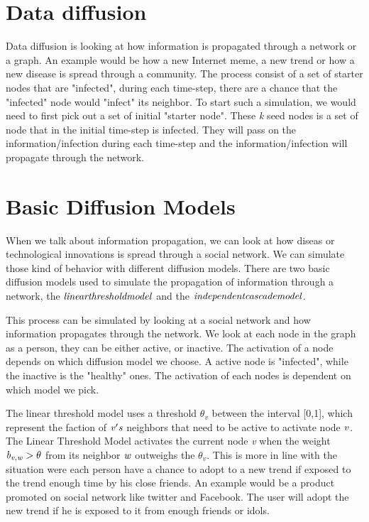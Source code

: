 \section{Data diffusion}
Data diffusion is looking at how information is propagated through a network or a graph. An example would be how a new Internet meme, a new trend or how a new disease is spread through a community. The process consist of a set of starter nodes that are "infected", during each time-step, there are a chance that the "infected" node would "infect" its neighbor. To start such a simulation, we would need to first pick out a set of initial "starter node". These {\it k} seed nodes is a set of node that in the initial time-step is infected. They will pass on the information/infection during each time-step and the information/infection will propagate through the network.

\section{Basic Diffusion Models}
When we talk about information propagation, we can look at how diseas or technological innovations is spread through a social network. We can simulate those kind of behavior with different diffusion models. There are two basic diffusion models used to simulate the propagation of information through a network\cite{MaximizeSpread2003}, the {$\it linear threshold model$} and the $\it{ independent cascade model}$\cite{MaximizeSpread2003}.

This process can be simulated by looking at a social network and how information propagates through the network. We look at each node in the graph as a person, they can be either active, or inactive. The activation of a node depends on which diffusion model we choose. A active node is "infected", while the inactive is the "healthy" ones. The activation of each nodes is dependent on which model we pick.

The linear threshold model uses a threshold $\theta_v$ between the interval [0,1], which represent the faction of $\it{v}'s$ neighbors that need to be active to activate node $\it{v}$. The Linear Threshold Model activates the current node {\it v} when the weight ${\it b_{v,w}} > \theta$ from its neighbor $\it{w}$ outweighs the $\theta_v$. This is more in line with the situation were each person have a chance to adopt to a new trend if exposed to the trend enough time by his close friends. An example would be a product promoted on social network like twitter and Facebook. The user will adopt the new trend if he is exposed to it from enough friends or idols. 

